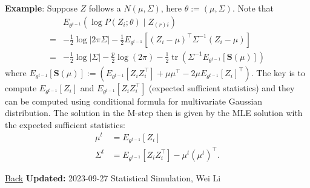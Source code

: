\documentclass[
  14pt,
]{article}
\begin{document}
\textbf{Example}: Suppose \(Z\) follows a \(N(\mu,\Sigma)\), here
\(\theta:=(\mu,\Sigma)\). Note that \begin{align*}
&E_{\theta^{t-1}}\left(\log P\left(Z_i; \theta\right) \mid Z_{(r) i}\right) \\ =&-\frac{1}{2} \log |2 \pi {\Sigma}|-\frac{1}{2}  {E}_{\theta^{t-1}}\left[\left(Z_i-{\mu}\right)^{\top} {\Sigma}^{-1}\left(Z_i-{\mu}\right)\right] \\
=&-\frac{1}{2} \log |{\Sigma}|-\frac{p}{2} \log (2 \pi)-\frac{1}{2} \operatorname{tr}\left({\Sigma}^{-1} {E}_{\theta^{t-1}}[\mathbf{S}({\mu})]\right)
\end{align*} where
\({E}_{\theta^{t-1}}[\mathbf{S}({\mu})]:= \left({E}_{\theta^{t-1}}\left[Z_i Z_i^{\top}\right]+{\mu} {\mu}^{\top}-2 {\mu} {E}_{\theta^{t-1}}\left[Z_i\right]^{\top}\right).\)
The key is to compute \({E}_{\theta^{t-1}}\left[Z_i\right]\) and
\({E}_{\theta^{t-1}}\left[Z_i Z_i^{\top}\right]\) (expected sufficient
statistics) and they can be computed using conditional formula for
multivariate Gaussian distribution. The solution in the M-step then is
given by the MLE solution with the expected sufficient statistics:
\begin{align*}
{\mu}^t & ={E}_{\theta^{t-1}}\left[Z_i\right] \\
{\Sigma}^t & ={E}_{\theta^{t-1}}\left[Z_i Z_i^{\top}\right]-{\mu}^t\left({\mu}^t\right)^{\top}.
\end{align*}

{ { \href{javascript:window.history.back()}{Back} } { \textbf{Updated:}
2023-09-27 } { Statistical Simulation, Wei Li } }
\end{document}
